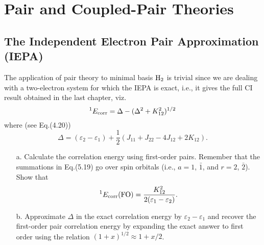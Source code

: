 \documentclass[a4paper]{book}
\newcounter{exercise}[chapter]
\newcommand{\corr}{{\rm corr}}
\begin{document}

	\chapter{Pair and Coupled-Pair Theories}
	
	\section{The Independent Electron Pair Approximation (IEPA)}
	
	\begin{exercise}
	The application of pair theory  to minimal basis $\ce{H2}$ is trivial since we are dealing with a two-electron system for which the IEPA is exact, i.e., it gives the full CI result obtained in the last chapter, viz.
	\[
		{}^{1}E_{\corr} = \Delta - ( \Delta^2 + K^2_{12} )^{1/2}
	\]
	where (see Eq.(4.20))
	\[
		\Delta = (\varepsilon_2 - \varepsilon_1) + \frac{1}{2}( J_{11} + J_{22} - 4J_{12} + 2K_{12} ).
	\]
	\begin{enumerate}
	
	\item[a.] Calculate the correlation energy using first-order pairs. Remember that the summations in Eq.(5.19) go over spin orbitals (i.e., $a=1$, $\bar{1}$, and $r=2$, $\bar{2}$). Show that
	\[
		{}^{1} E_{\corr}({\rm FO}) = \frac{K^2_{12}}{ 2 ( \varepsilon_1 - \varepsilon_2) }.
	\]
	
	\item[b.] Approximate $\Delta$ in the exact correlation energy by $\varepsilon_2 - \varepsilon_1$ and recover the first-order pair correlation energy by expanding the exact answer to first order using the relation $(1+x)^{1/2} \approx 1 + x/2$.
	\end{enumerate}
	\end{exercise}
	
\end{document}

